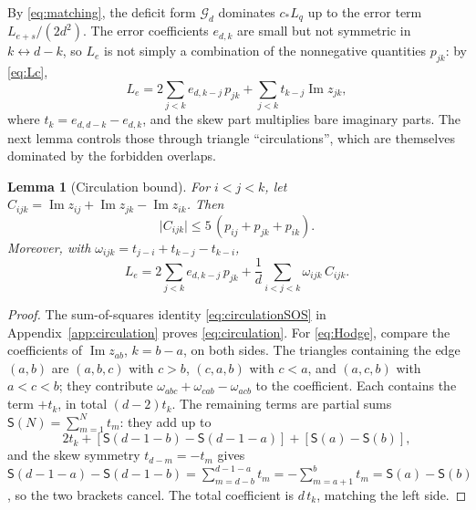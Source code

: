 \documentclass[aps,prl,reprint,superscriptaddress,longbibliography,floatfix,raggedbottom]{revtex4-2}
\newtheorem{lemma}{Lemma}
\newcommand{\abs}[1]{\lvert #1\rvert}
\newcommand{\cstar}{c_*}
\newcommand{\Gd}{\mathcal G_d}
\begin{document}
By \eqref{eq:matching}, the deficit form $\Gd$ dominates
$\cstar L_q$ up to the error term $L_{e+s}/(2d^2)$. The error
coefficients $e_{d,k}$ are small but not symmetric in
$k\leftrightarrow d-k$, so $L_{e}$ is not simply a combination of the
nonnegative quantities $p_{jk}$: by \eqref{eq:Lc},
\[
L_{e}=2\sum_{j<k}e_{d,k-j}\,p_{jk}
+\sum_{j<k}t_{k-j}\operatorname{Im}z_{jk},
\]
where $t_k=e_{d,d-k}-e_{d,k}$, and the skew part multiplies bare
imaginary parts. The next lemma
controls those through triangle ``circulations'', which are themselves
dominated by the forbidden overlaps.

\begin{lemma}[Circulation bound]\label{lem:circulation}
For $i<j<k$, let
$C_{ijk}=\operatorname{Im}z_{ij}+\operatorname{Im}z_{jk}
-\operatorname{Im}z_{ik}$. Then
\begin{equation}\label{eq:circulation}
\abs{C_{ijk}}\le5\,(p_{ij}+p_{jk}+p_{ik}).
\end{equation}
Moreover, with $\omega_{ijk}=t_{j-i}+t_{k-j}-t_{k-i}$,
\begin{equation}\label{eq:Hodge}
L_e=2\sum_{j<k}e_{d,k-j}\,p_{jk}
+\frac1d\sum_{i<j<k}\omega_{ijk}\,C_{ijk}.
\end{equation}
\end{lemma}

\begin{proof}
The sum-of-squares identity \eqref{eq:circulationSOS} in
Appendix~\ref{app:circulation} proves \eqref{eq:circulation}. For
\eqref{eq:Hodge}, compare the coefficients of
$\operatorname{Im}z_{ab}$, $k=b-a$, on both sides. The triangles
containing the edge $(a,b)$ are $(a,b,c)$ with $c>b$, $(c,a,b)$ with
$c<a$, and $(a,c,b)$ with $a<c<b$; they contribute
$\omega_{abc}+\omega_{cab}-\omega_{acb}$ to the coefficient. Each
contains the term $+t_k$, in total $(d-2)t_k$. The remaining terms are
partial sums $\mathsf S(N)=\sum_{m=1}^Nt_m$: they add up to
\[
2t_k+[\mathsf S(d{-}1{-}b)-\mathsf S(d{-}1{-}a)]
+[\mathsf S(a)-\mathsf S(b)],
\]
and the skew symmetry $t_{d-m}=-t_m$ gives
$\mathsf S(d{-}1{-}a)-\mathsf S(d{-}1{-}b)
=\sum_{m=d-b}^{d-1-a}t_m=-\sum_{m=a+1}^bt_m=\mathsf S(a)-\mathsf S(b)$,
so the two brackets cancel. The total coefficient is $d\,t_k$, matching
the left side.
\end{proof}
\end{document}
